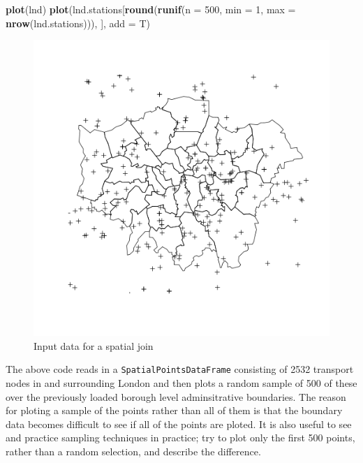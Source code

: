 \documentclass[]{article}
\makeatletter
\newenvironment{Shaded}{}{}
\newcommand{\KeywordTok}[1]{\textcolor[rgb]{0.00,0.44,0.13}{\textbf{{#1}}}}
\newcommand{\DataTypeTok}[1]{\textcolor[rgb]{0.56,0.13,0.00}{{#1}}}
\newcommand{\DecValTok}[1]{\textcolor[rgb]{0.25,0.63,0.44}{{#1}}}
\newcommand{\NormalTok}[1]{{#1}}
\def\maxwidth{\ifdim\Gin@nat@width>\linewidth\linewidth
\else\Gin@nat@width\fi}
\let\Oldincludegraphics\includegraphics
\renewcommand{\includegraphics}[1]{\Oldincludegraphics[width=\maxwidth]{#1}}
\makeatother
\begin{document}
\begin{Shaded}
\begin{Highlighting}[]
\KeywordTok{plot}\NormalTok{(lnd)}
\KeywordTok{plot}\NormalTok{(lnd.stations[}\KeywordTok{round}\NormalTok{(}\KeywordTok{runif}\NormalTok{(}\DataTypeTok{n =} \DecValTok{500}\NormalTok{, }\DataTypeTok{min =} \DecValTok{1}\NormalTok{, }\DataTypeTok{max =} \KeywordTok{nrow}\NormalTok{(lnd.stations))), }
    \NormalTok{], }\DataTypeTok{add =} \NormalTok{T)}
\end{Highlighting}
\end{Shaded}

\begin{figure}[htbp]
\centering
\includegraphics{figure/Input_data_for_a_spatial_join.png}
\caption{Input data for a spatial join}
\end{figure}

The above code reads in a \texttt{SpatialPointsDataFrame} consisting of
2532 transport nodes in and surrounding London and then plots a random
sample of 500 of these over the previously loaded borough level
adminsitrative boundaries. The reason for ploting a sample of the points
rather than all of them is that the boundary data becomes difficult to
see if all of the points are ploted. It is also useful to see and
practice sampling techniques in practice; try to plot only the first 500
points, rather than a random selection, and describe the difference.
\end{document}
